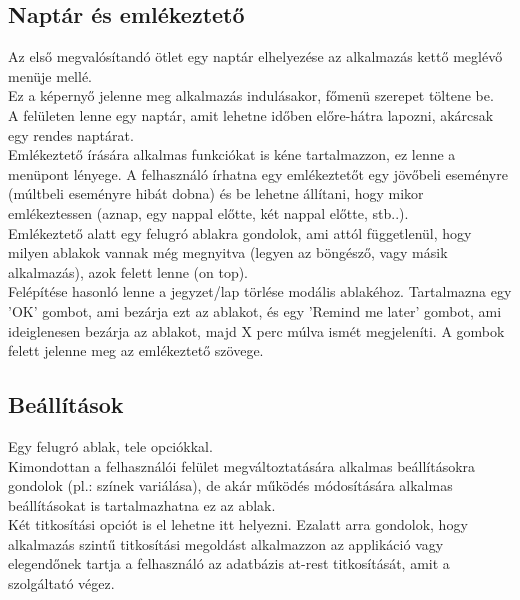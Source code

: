 \subsection{Naptár és emlékeztető}
Az első megvalósítandó ötlet egy naptár elhelyezése az alkalmazás kettő meglévő menüje mellé.
\\Ez a képernyő jelenne meg alkalmazás indulásakor, főmenü szerepet töltene be.
\vspace{5pt}\\A felületen lenne egy naptár, amit lehetne időben előre-hátra lapozni, akárcsak egy rendes naptárat.
\vspace{5pt}\\Emlékeztető írására alkalmas funkciókat is kéne tartalmazzon, ez lenne a menüpont lényege. A felhasználó írhatna egy emlékeztetőt egy jövőbeli eseményre (múltbeli eseményre hibát dobna) és be lehetne állítani, hogy mikor emlékeztessen (aznap, egy nappal előtte, két nappal előtte, stb..).
\vspace{5pt}\\Emlékeztető alatt egy felugró ablakra gondolok, ami attól függetlenül, hogy milyen ablakok vannak még megnyitva (legyen az böngésző, vagy másik alkalmazás), azok felett lenne (on top). 
\\Felépítése hasonló lenne a jegyzet/lap törlése modális ablakéhoz.
Tartalmazna egy 'OK' gombot, ami bezárja ezt az ablakot, és egy 'Remind me later' gombot, ami ideiglenesen bezárja az ablakot, majd X perc múlva ismét megjeleníti. A gombok felett jelenne meg az emlékeztető szövege.


\subsection{Beállítások}
Egy felugró ablak, tele opciókkal.
\\Kimondottan a felhasználói felület megváltoztatására alkalmas beállításokra gondolok (pl.: színek variálása), de akár működés	módosítására alkalmas beállításokat is tartalmazhatna ez az ablak.
\\Két titkosítási opciót is el lehetne itt helyezni. Ezalatt arra gondolok, hogy alkalmazás szintű titkosítási megoldást alkalmazzon az applikáció vagy elegendőnek tartja a felhasználó az adatbázis at-rest titkosítását, amit a szolgáltató végez.

